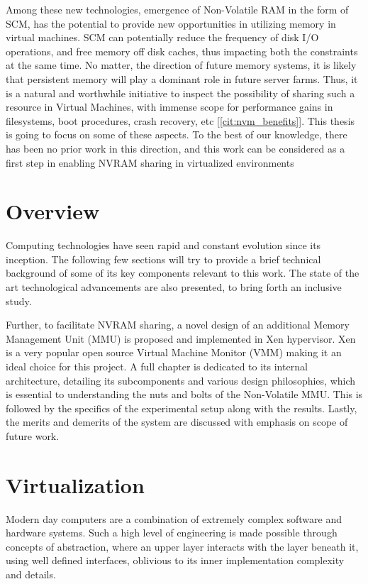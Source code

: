 Among these new technologies, emergence of Non-Volatile RAM in the form of SCM, has the potential to provide new opportunities in utilizing memory in virtual machines. SCM can potentially reduce the frequency of disk I/O operations, and free memory off disk caches, thus impacting both the constraints at the same time. No matter, the direction of future memory systems, it is likely that persistent memory will play a dominant role in future server farms. Thus, it is a natural and worthwhile initiative to inspect the possibility of sharing such a resource in Virtual Machines, with immense scope for performance gains in filesystems, boot procedures, crash recovery, etc [\ref{cit:nvm_benefits}]. This thesis is going to focus on some of these aspects. To the best of our knowledge, there has been no prior work in this direction, and this work can be considered as a first step in enabling NVRAM sharing in virtualized environments 

\section{Overview}

Computing technologies have seen rapid and constant evolution since its inception. The following few sections will try to provide a brief technical background of some of its key components relevant to this work. The state of the art technological advancements are also presented, to bring forth an inclusive study.

Further, to facilitate NVRAM sharing, a novel design of an additional Memory Management Unit (MMU) is proposed and implemented in Xen hypervisor. Xen is a very popular open source Virtual Machine Monitor (VMM) making it an ideal choice for this project. A full chapter is dedicated to its internal architecture, detailing its subcomponents and various design philosophies, which is essential to understanding the nuts and bolts of the Non-Volatile MMU. This is followed by the specifics of the experimental setup along with the results. Lastly, the merits and demerits of the system are discussed with emphasis on scope of future work. 

\section{Virtualization}
Modern day computers are a combination of extremely complex software and hardware systems. Such a high level of engineering is made possible through concepts of abstraction, where an upper layer interacts with the layer beneath it, using well defined interfaces, oblivious to its inner implementation complexity and details.

